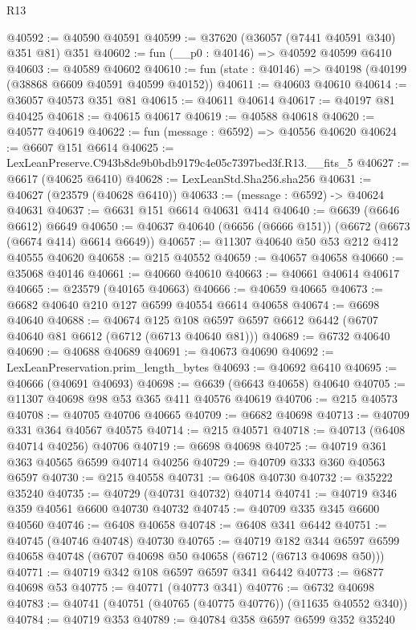 \begin{lexlean}{R13}
\begin{coremodule}
@40592 := @40590 @40591
@40599 := @37620 (@36057 (@7441 @40591 @340) @351 @81) @351
@40602 := fun (__p0 : @40146) => @40592 @40599 @6410
@40603 := @40589 @40602
@40610 := fun (state : @40146) => @40198 (@40199 (@38868 @6609 @40591 @40599 @40152))
@40611 := @40603 @40610
@40614 := @36057 @40573 @351 @81
@40615 := @40611 @40614
@40617 := @40197 @81 @40425
@40618 := @40615 @40617
@40619 := @40588 @40618
@40620 := @40577 @40619
@40622 := fun (message : @6592) => @40556 @40620
@40624 := @6607 @151 @6614
@40625 := LexLeanPreserve.C943b8de9b0bdb9179c4e05c7397bed3f.R13.__fits_5
@40627 := @6617 (@40625 @6410)
@40628 := LexLeanStd.Sha256.sha256
@40631 := @40627 (@23579 (@40628 @6410))
@40633 := (message : @6592) -> @40624 @40631
@40637 := @6631 @151 @6614 @40631 @414
@40640 := @6639 (@6646 @6612) @6649
@40650 := @40637 @40640 (@6656 (@6666 @151)) (@6672 (@6673 (@6674 @414) @6614 @6649))
@40657 := @11307 @40640 @50 @53 @212 @412 @40555 @40620
@40658 := @215 @40552
@40659 := @40657 @40658
@40660 := @35068 @40146
@40661 := @40660 @40610
@40663 := @40661 @40614 @40617
@40665 := @23579 (@40165 @40663)
@40666 := @40659 @40665
@40673 := @6682 @40640 @210 @127 @6599 @40554 @6614 @40658
@40674 := @6698 @40640
@40688 := @40674
    @125
    @108
    @6597
    @6597
    @6612
    @6442
    (@6707 @40640 @81 @6612 (@6712 (@6713 @40640 @81)))
@40689 := @6732 @40640
@40690 := @40688 @40689
@40691 := @40673 @40690
@40692 := LexLeanPreservation.prim_length_bytes
@40693 := @40692 @6410
@40695 := @40666 (@40691 @40693)
@40698 := @6639 (@6643 @40658) @40640
@40705 := @11307 @40698 @98 @53 @365 @411 @40576 @40619
@40706 := @215 @40573
@40708 := @40705 @40706 @40665
@40709 := @6682 @40698
@40713 := @40709 @331 @364 @40567 @40575
@40714 := @215 @40571
@40718 := @40713 (@6408 @40714 @40256) @40706
@40719 := @6698 @40698
@40725 := @40719 @361 @363 @40565 @6599 @40714 @40256
@40729 := @40709 @333 @360 @40563 @6597
@40730 := @215 @40558
@40731 := @6408 @40730
@40732 := @35222 @35240
@40735 := @40729 (@40731 @40732) @40714
@40741 := @40719 @346 @359 @40561 @6600 @40730 @40732
@40745 := @40709 @335 @345 @6600 @40560
@40746 := @6408 @40658
@40748 := @6408 @341 @6442
@40751 := @40745 (@40746 @40748) @40730
@40765 := @40719
    @182
    @344
    @6597
    @6599
    @40658
    @40748
    (@6707 @40698 @50 @40658 (@6712 (@6713 @40698 @50)))
@40771 := @40719 @342 @108 @6597 @6597 @341 @6442
@40773 := @6877 @40698 @53
@40775 := @40771 (@40773 @341)
@40776 := @6732 @40698
@40783 := @40741 (@40751 (@40765 (@40775 @40776)) (@11635 @40552 @340))
@40784 := @40719 @353
@40789 := @40784 @358 @6597 @6599 @352 @35240

\end{coremodule}
\end{lexlean}
